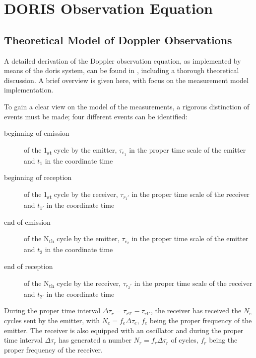 \section{DORIS Observation Equation}\label{sec:doris-observation-equation}

\subsection{Theoretical Model of Doppler Observations}\label{ssec:doris-obs-theory}
A detailed derivation of the Doppler observation equation, as implemented by means of the 
\gls{doris} system, can be found in \cite{Lemoine2016}, including a thorough theoretical 
discussion. A brief overview is given here, with focus on the measurement model 
implementation.

To gain a clear view on the model of the measurements, a rigorous distinction of 
events must be made; four different events can be identified:
\begin{description}
    \item[beginning of emission] of the 1\textsubscript{st} cycle by the emitter, 
    \(\tau_{e_1}\) in the proper time scale of the emitter and \(t_1\) in the coordinate 
    time
    
    \item[beginning of reception] of the 1\textsubscript{st} cycle by the receiver, 
    \(\tau_{r_1'}\) in the proper time scale of the receiver and 
    \(t_{1'}\) in the coordinate time

    \item[end of emission] of the N\textsubscript{th} cycle by the emitter, 
    \(\tau_{e_2}\) in the proper time scale of the emitter and \(t_2\) in the coordinate 
    time
    
    \item[end of reception] of the N\textsubscript{th} cycle by the receiver, 
    \(\tau_{r_2'}\) in the proper time scale of the receiver and 
    \(t_{2'}\) in the coordinate time
\end{description}

During the proper time interval $\Delta\tau_{r} = \tau_{r2'} - \tau_{r1'}$, 
the receiver has received the $N_e$ cycles sent by the emitter, with $N_e = f_e \Delta\tau_e$, 
$f_e$ being the proper frequency of the emitter. The receiver is also equipped with
an oscillator and during the proper time interval $\Delta\tau_{r}$ has generated 
a number $N_r = f_r \Delta\tau_r$ of cycles, $f_r$ being the proper frequency of the 
receiver.


